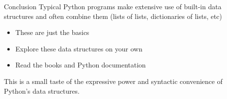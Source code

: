 \documentclass[smaller, aspectratio=1610]{beamer}
\begin{document}
\begin{frame}[label={sec:orgf97d646}]{Conclusion}
Typical Python programs make extensive use of built-in data structures and often combine them (lists of lists, dictionaries of lists, etc)

\begin{itemize}
\item These are just the basics
\item Explore these data structures on your own
\item Read the books and Python documentation
\end{itemize}


This is a small taste of the expressive power and syntactic convenience of Python's data structures.
\end{frame}
\end{document}

